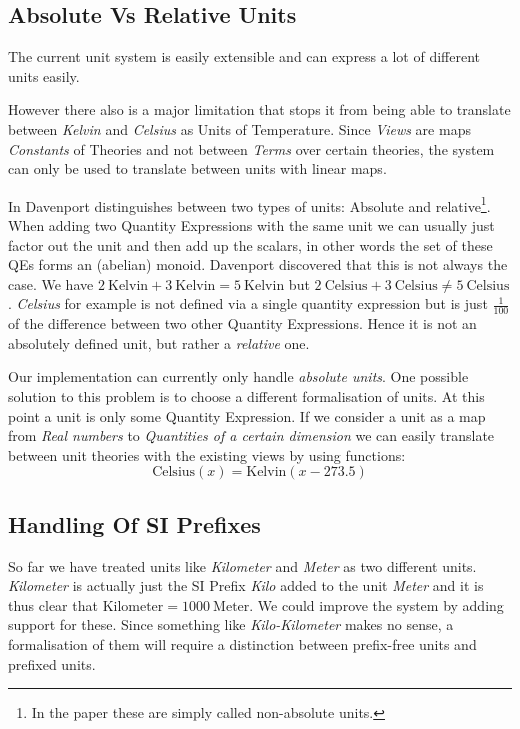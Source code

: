 \subsection{Absolute Vs Relative Units}
The current unit system is easily extensible and can express a lot of different units easily.

However there also is a major limitation that stops it from being able to translate between \textit{Kelvin} and \textit{Celsius} as Units of Temperature. Since \textit{Views} are maps \textit{Constants} of Theories and not between \textit{Terms} over certain theories, the system can only be used to translate between units with linear maps.

In \cite{SD:UnitKnowledgeMgmt08} Davenport distinguishes between two types of units: Absolute and relative\footnote{In the paper these are simply called non-absolute units. }. When adding two Quantity Expressions with the same unit we can usually just factor out the unit and then add up the scalars, in other words the set of these QEs forms an (abelian) monoid. Davenport discovered that this is not always the case. We have $2\ \text{Kelvin} + 3\ \text{Kelvin} = 5\ \text{Kelvin}$ but $2\ \text{Celsius} + 3\ \text{Celsius} \neq 5\ \text{Celsius}$. \textit{Celsius} for example is not defined via a single quantity expression but is just $\frac{1}{100}$ of the difference between two other Quantity Expressions. Hence it is not an absolutely defined unit, but rather a \textit{relative} one.

Our implementation can currently only handle \textit{absolute units}. One possible solution to this problem is to choose a different formalisation of units. At this point a unit is only some Quantity Expression. If we consider a unit as a map from \textit{Real numbers} to \textit{Quantities of a certain dimension} we can easily translate between unit theories with the existing views by using functions:
\[\text{Celsius}(x) = \text{Kelvin}(x - 273.5)\]


\subsection{Handling Of SI Prefixes}
So far we have treated units like \textit{Kilometer} and \textit{Meter} as two different units. \textit{Kilometer} is actually just the SI Prefix \textit{Kilo} added to the unit \textit{Meter} and it is thus clear that $\text{Kilometer} = 1000\ \text{Meter}$. We could improve the system by adding support for these. Since something like \textit{Kilo-Kilometer} makes no sense, a formalisation of them will require a distinction between prefix-free units and prefixed units.

